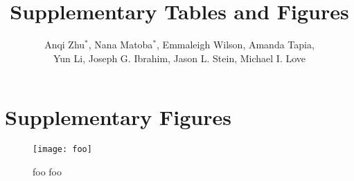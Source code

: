 \documentclass[11pt]{article}
\title{Supplementary Tables and Figures}
\author{Anqi Zhu$^*$, Nana Matoba$^*$, Emmaleigh Wilson, Amanda Tapia,
  \\ Yun Li, Joseph G. Ibrahim, Jason L. Stein, Michael I. Love}
\begin{document}
\maketitle
\section{Supplementary Figures}

\begin{figure}[!ht]
  \centering
  \texttt{[image: foo]}
  \caption{foo foo}
\end{figure}
\end{document}
